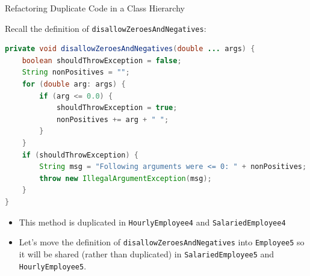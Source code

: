 \documentclass{beamer}
\begin{document}
\begin{frame}[fragile]{Refactoring Duplicate Code in a Class Hierarchy}

\vspace{-.05in}
Recall the definition of {\tt disallowZeroesAndNegatives}:
\vspace{-.05in}
\begin{lstlisting}[language=Java]
private void disallowZeroesAndNegatives(double ... args) {
    boolean shouldThrowException = false;
    String nonPositives = "";
    for (double arg: args) {
        if (arg <= 0.0) {
            shouldThrowException = true;
            nonPositives += arg + " ";
        }
    }
    if (shouldThrowException) {
        String msg = "Following arguments were <= 0: " + nonPositives;
        throw new IllegalArgumentException(msg);
    }
}
\end{lstlisting}
\vspace{-.075in}
\begin{itemize}
\item This method is duplicated in {\tt HourlyEmployee4} and {\tt SalariedEmployee4}
\item Let's move the definition of {\tt disallowZeroesAndNegatives} into {\tt Employee5} so it will be shared (rather than duplicated) in {\tt SalariedEmployee5} and {\tt HourlyEmployee5}.
\end{itemize}


\end{frame}



\end{document}

